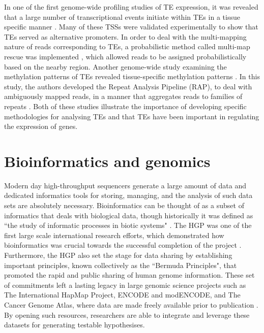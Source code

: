 In one of the first genome-wide profiling studies of TE expression, it was revealed that a large number of transcriptional events initiate within TEs in a tissue specific manner \citep{pmid19377475}. Many of these TSSs were validated experimentally to show that TEs served as alternative promoters. In order to deal with the multi-mapping nature of reads corresponding to TEs, a probabilistic method called multi-map rescue was implemented \citep{pmid18178374}, which allowed reads to be assigned probabilistically based on the nearby region. Another genome-wide study examining the methylation patterns of TEs revealed tissue-specific methylation patterns \citep{pmid23708189}. In this study, the authors developed the Repeat Analysis Pipeline (RAP), to deal with ambiguously mapped reads, in a manner that aggregates reads to families of repeats \citep{pmid20584328}. Both of these studies illustrate the importance of developing specific methodologies for analysing TEs and that TEs have been important in regulating the expression of genes.

\section{Bioinformatics and genomics}

Modern day high-throughput sequencers generate a large amount of data and dedicated informatics tools for storing, managing, and the analysis of such data sets are absolutely necessary. Bioinformatics can be thought of as a subset of informatics that deals with biological data, though historically it was defined as ``the study of informatic processes in biotic systems" \citep{pmid21483479}. The HGP was one of the first large scale international research efforts, which demonstrated how bioinformatics was crucial towards the successful completion of the project \citep{stein1996perl}. Furthermore, the HGP also set the stage for data sharing by establishing important principles, known collectively as the ``Bermuda Principles", that promoted the rapid and public sharing of human genome information. These set of commitments left a lasting legacy in large genomic science projects such as The International HapMap Project, ENCODE and modENCODE, and The Cancer Genome Atlas, where data are made freely available prior to publication \citep{contreras2011bermuda}. By opening such resources, researchers are able to integrate and leverage these datasets for generating testable hypothesises.

